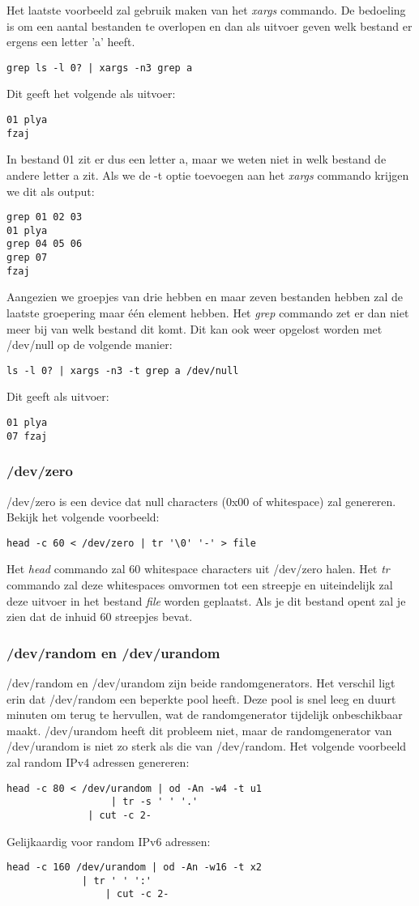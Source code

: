 \documentclass{report}
\begin{document}
Het laatste voorbeeld zal gebruik maken van het \textit{xargs} commando. De bedoeling is om een aantal bestanden te overlopen en dan als uitvoer geven welk bestand er ergens een letter 'a' heeft.
\begin{lstlisting}
grep ls -l 0? | xargs -n3 grep a
\end{lstlisting}
Dit geeft het volgende als uitvoer:
\begin{lstlisting}
01 plya
fzaj
\end{lstlisting}
In bestand 01 zit er dus een letter a, maar we weten niet in welk bestand de andere letter a zit. Als we de -t optie toevoegen aan het \textit{xargs} commando krijgen we dit als output:
\begin{lstlisting}
grep 01 02 03
01 plya
grep 04 05 06
grep 07
fzaj
\end{lstlisting}
Aangezien we groepjes van drie hebben en maar zeven bestanden hebben zal de laatste groepering maar één element hebben. Het \textit{grep} commando zet er dan niet meer bij van welk bestand dit komt. Dit kan ook weer opgelost worden met /dev/null op de volgende manier:
\begin{lstlisting}
ls -l 0? | xargs -n3 -t grep a /dev/null
\end{lstlisting}
Dit geeft als uitvoer:
\begin{lstlisting}
01 plya
07 fzaj
\end{lstlisting}
\subsubsection{/dev/zero}
/dev/zero is een device dat null characters (0x00 of whitespace) zal genereren. Bekijk het volgende voorbeeld:
\begin{lstlisting}
head -c 60 < /dev/zero | tr '\0' '-' > file
\end{lstlisting}
Het \textit{head} commando zal 60 whitespace characters uit /dev/zero halen. Het \textit{tr} commando zal deze whitespaces omvormen tot een streepje en uiteindelijk zal deze uitvoer in het bestand \textit{file} worden geplaatst. Als je dit bestand opent zal je zien dat de inhuid 60 streepjes bevat.

\subsubsection{/dev/random en /dev/urandom}
/dev/random en /dev/urandom zijn beide randomgenerators. Het verschil ligt erin dat /dev/random een beperkte pool heeft. Deze pool is snel leeg en duurt minuten om terug te hervullen, wat de randomgenerator tijdelijk onbeschikbaar maakt. /dev/urandom heeft dit probleem niet, maar de randomgenerator van /dev/urandom is niet zo sterk als die van /dev/random.
Het volgende voorbeeld zal random IPv4 adressen genereren:
\begin{lstlisting}
head -c 80 < /dev/urandom | od -An -w4 -t u1
		      	  | tr -s ' ' '.' 
		 	  | cut -c 2-
\end{lstlisting}
Gelijkaardig voor random IPv6 adressen:
\begin{lstlisting}
head -c 160 /dev/urandom | od -An -w16 -t x2
			 | tr ' ' ':'
		         | cut -c 2-
\end{lstlisting}
\end{document}
